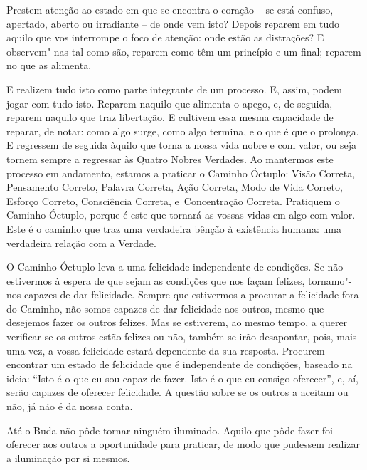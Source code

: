 Prestem atenção ao estado em que se encontra o coração -- se está confuso,
apertado, aberto ou irradiante -- de onde vem isto? Depois reparem em tudo
aquilo que vos interrompe o foco de atenção: onde estão as distrações? E
observem"-nas tal como são, reparem como têm um princípio e um final; reparem no
que as alimenta.

E realizem tudo isto como parte integrante de um processo. E, assim, podem jogar
com tudo isto. Reparem naquilo que alimenta o apego, e, de seguida, reparem
naquilo que traz libertação. E cultivem essa mesma capacidade de reparar, de
notar: como algo surge, como algo termina, e o que é que o prolonga. E regressem
de seguida àquilo que torna a nossa vida nobre e com valor, ou seja tornem
sempre a regressar às Quatro Nobres Verdades. Ao mantermos este processo em
andamento, estamos a praticar o Caminho Óctuplo: Visão Correta, Pensamento Correto,
Palavra Correta, Ação Correta, Modo de Vida Correto, Esforço Correto, 
Consciência Correta, e~Concentração Correta. Pratiquem o Caminho Óctuplo,
porque é este que tornará as vossas vidas em algo com valor. Este é o
caminho que traz uma verdadeira bênção à existência humana: uma verdadeira
relação com a Verdade.

\enlargethispage{\baselineskip}

O Caminho Óctuplo leva a uma felicidade independente de condições. Se não
estivermos à espera de que sejam as condições que nos façam felizes, tornamo"-nos
capazes de dar felicidade. Sempre que estivermos a procurar a felicidade fora do
Caminho, não somos capazes de dar felicidade aos outros, mesmo que desejemos
fazer os outros felizes. Mas se estiverem, ao mesmo tempo, a querer verificar se
os outros estão felizes ou não, também se irão desapontar, pois, mais uma vez, a
vossa felicidade estará dependente da sua resposta. Procurem encontrar um estado
de felicidade que é independente de condições, baseado na ideia: ``Isto é o que
eu sou capaz de fazer. Isto é o que eu consigo oferecer'', e, aí, serão capazes
de oferecer felicidade. A questão sobre se os outros a aceitam ou não, já não é
da nossa conta.

Até o Buda não pôde tornar ninguém iluminado. Aquilo que pôde fazer foi oferecer
aos outros a oportunidade para praticar, de modo que pudessem realizar a
iluminação por si mesmos.

\enlargethispage{2\baselineskip}

